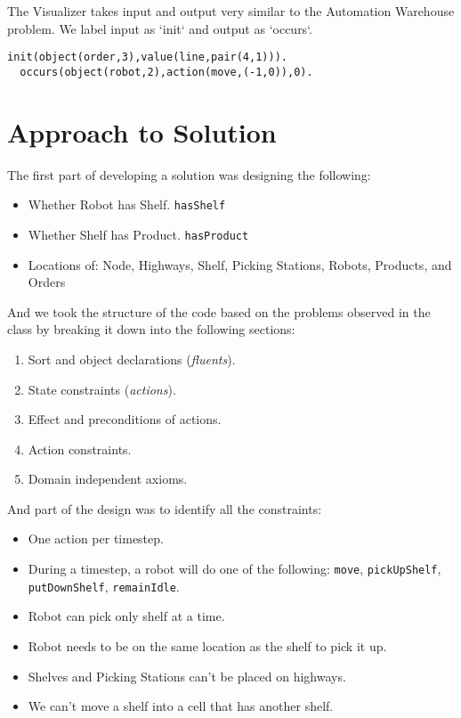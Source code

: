 \documentclass[letterpaper]{article} %
\begin{document}
The Visualizer takes input and output very similar to the Automation Warehouse problem. We label input as `init` and output as `occurs`. 

\begin{lstlisting}[numbers=none,language=clingo]
  init(object(order,3),value(line,pair(4,1))).
  occurs(object(robot,2),action(move,(-1,0)),0).
\end{lstlisting}

\section{Approach to Solution}

The first part of developing a solution was designing the following:

\begin{itemize}
  \item Whether Robot has Shelf. \texttt{hasShelf}
  \item Whether Shelf has Product. \texttt{hasProduct}
  \item Locations of: Node, Highways, Shelf, Picking Stations, Robots, Products, and Orders
\end{itemize}

And we took the structure of the code based on the problems observed in the class by breaking it down into the following sections:

\begin{enumerate}
  \item Sort and object declarations (\textit{fluents}).
  \item State constraints (\textit{actions}).
  \item Effect and preconditions of actions.
  \item Action constraints.
  \item Domain independent axioms.
\end{enumerate}

And part of the design was to identify all the constraints:

\begin{itemize}
  \item One action per timestep.
  \item During a timestep, a robot will do one of the following: \texttt{move}, \texttt{pickUpShelf}, \texttt{putDownShelf}, \texttt{remainIdle}.
  \item Robot can pick only shelf at a time.
  \item Robot needs to be on the same location as the shelf to pick it up.
  \item Shelves and Picking Stations can't be placed on highways.
  \item We can't move a shelf into a cell that has another shelf. 
\end{itemize}
\end{document}
